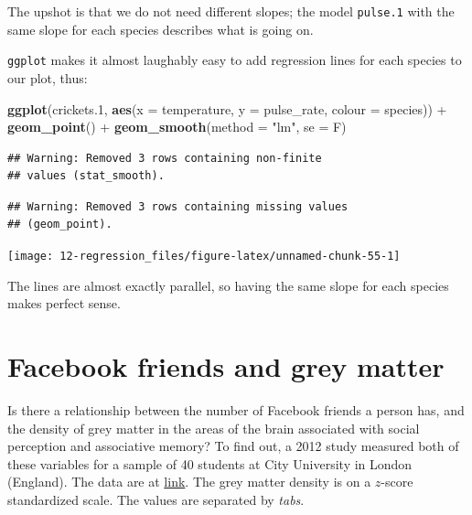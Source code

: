 \documentclass[]{tufte-book}
\newenvironment{Shaded}{}{}
\newcommand{\DataTypeTok}[1]{\textcolor[rgb]{0.56,0.13,0.00}{#1}}
\newcommand{\FloatTok}[1]{\textcolor[rgb]{0.25,0.63,0.44}{#1}}
\newcommand{\KeywordTok}[1]{\textcolor[rgb]{0.00,0.44,0.13}{\textbf{#1}}}
\newcommand{\NormalTok}[1]{#1}
\newcommand{\OperatorTok}[1]{\textcolor[rgb]{0.40,0.40,0.40}{#1}}
\newcommand{\StringTok}[1]{\textcolor[rgb]{0.25,0.44,0.63}{#1}}
\theoremstyle{definition}
\theoremstyle{definition}
\theoremstyle{definition}
\theoremstyle{remark}
\begin{document}
The upshot is that we do not need different slopes; the model
\texttt{pulse.1} with the same slope for each species describes what is
going on.

\texttt{ggplot} makes it almost laughably easy to add regression lines
for each species to our plot, thus:

\begin{Shaded}
\begin{Highlighting}[]
\KeywordTok{ggplot}\NormalTok{(crickets}\FloatTok{.1}\NormalTok{, }\KeywordTok{aes}\NormalTok{(}\DataTypeTok{x =}\NormalTok{ temperature, }\DataTypeTok{y =}\NormalTok{ pulse_rate, }
    \DataTypeTok{colour =}\NormalTok{ species)) }\OperatorTok{+}\StringTok{ }\KeywordTok{geom_point}\NormalTok{() }\OperatorTok{+}\StringTok{ }\KeywordTok{geom_smooth}\NormalTok{(}\DataTypeTok{method =} \StringTok{"lm"}\NormalTok{, }
    \DataTypeTok{se =}\NormalTok{ F)}
\end{Highlighting}
\end{Shaded}

\begin{verbatim}
## Warning: Removed 3 rows containing non-finite
## values (stat_smooth).
\end{verbatim}

\begin{verbatim}
## Warning: Removed 3 rows containing missing values
## (geom_point).
\end{verbatim}

\texttt{[image: 12-regression\_files/figure-latex/unnamed-chunk-55-1]}

The lines are almost exactly parallel, so having the same slope for each
species makes perfect sense.

\hypertarget{facebook-friends-and-grey-matter}{%
\section{Facebook friends and grey
matter}\label{facebook-friends-and-grey-matter}}

Is there a relationship between the number of Facebook friends a person
has, and the density of grey matter in the areas of the brain associated
with social perception and associative memory? To find out, a 2012 study
measured both of these variables for a sample of 40 students at City
University in London (England). The data are at
\href{http://www.utsc.utoronto.ca/~butler/c32/facebook.txt}{link}. The
grey matter density is on a \(z\)-score standardized scale. The values
are separated by \emph{tabs}.
\end{document}
